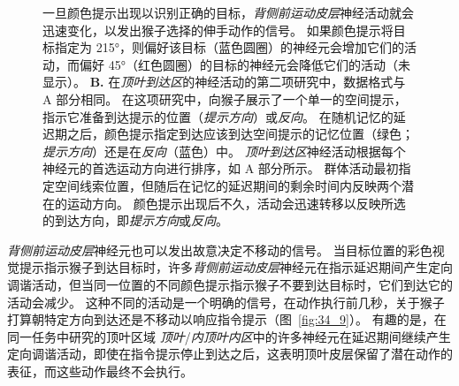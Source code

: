 \begin{figure}[htbp]
{		一旦颜色提示出现以识别正确的目标，\textit{背侧前运动皮层}神经活动就会迅速变化，以发出猴子选择的伸手动作的信号。
		如果颜色提示将目标指定为 215°，则偏好该目标（蓝色圆圈）的神经元会增加它们的活动，而偏好 45°（红色圆圈）的目标的神经元会降低它们的活动（未显示）\cite{cisek2010neural}。
		\textbf{B.} 在\textit{顶叶到达区}的神经活动的第二项研究中，数据格式与 A 部分相同。
		在这项研究中，向猴子展示了一个单一的空间提示，指示它准备到达提示的位置（\textit{提示方向}）或\textit{反向}。
		在随机记忆的延迟期之后，颜色提示指定到达应该到达空间提示的记忆位置（绿色；\textit{提示方向}）还是在\textit{反向}（蓝色）中。
		\textit{顶叶到达区}神经活动根据每个神经元的首选运动方向进行排序，如 A 部分所示。
		群体活动最初指定空间线索位置，但随后在记忆的延迟期间的剩余时间内反映两个潜在的运动方向。
		颜色提示出现后不久，活动会迅速转移以反映所选的到达方向，即\textit{提示方向}或\textit{反向}\cite{klaes2011choosing}。}
	\label{fig:34_8}
\end{figure}


\textit{背侧前运动皮层}神经元也可以发出故意决定不移动的信号。
当目标位置的彩色视觉提示指示猴子到达目标时，许多\textit{背侧前运动皮层}神经元在指示延迟期间产生定向调谐活动，但当同一位置的不同颜色提示指示猴子不要到达目标时，它们到达它的活动会减少。
这种不同的活动是一个明确的信号，在动作执行前几秒，关于猴子打算朝特定方向到达还是不移动以响应指令提示（图~\ref{fig:34_9}）。
有趣的是，在同一任务中研究的顶叶区域 \textit{顶叶}/\textit{内顶叶内区}中的许多神经元在延迟期间继续产生定向调谐活动，即使在指令提示停止到达之后，这表明顶叶皮层保留了潜在动作的表征，而这些动作最终不会执行。


